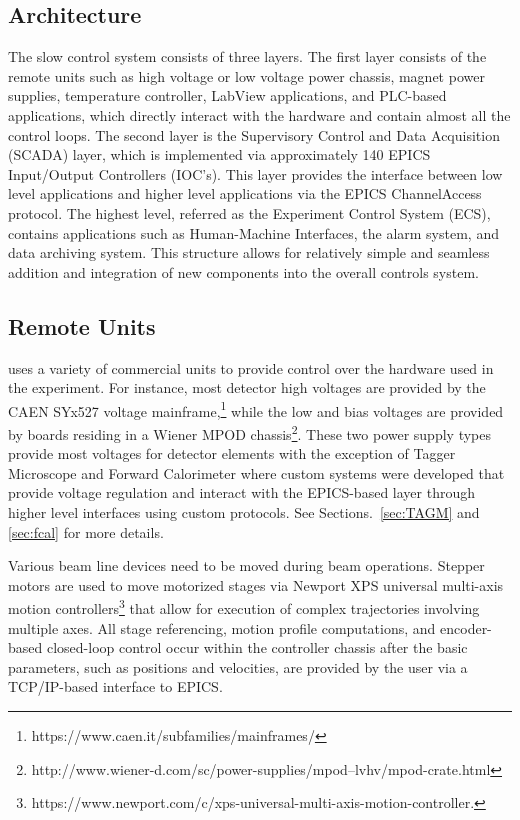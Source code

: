\subsection{Architecture \label{sec:controlsarchitechture}}
The \gx{} slow control system consists of three layers. The first layer consists of the remote units such as high voltage or low voltage power chassis, magnet power supplies, temperature controller, LabView applications, and PLC-based applications, which directly interact with the hardware and contain almost all the control loops. The second layer is the Supervisory Control and Data Acquisition (SCADA) layer, which is implemented via approximately 140 EPICS Input/Output Controllers (IOC's). This layer provides the interface between low level applications and higher level applications via the EPICS ChannelAccess protocol. The highest level, referred as the Experiment Control System (ECS), contains applications such as Human-Machine Interfaces, the alarm system, and data archiving system. This structure allows for relatively simple and seamless addition and integration of new components into the overall controls system.    

\subsection{Remote Units \label{sec:controlsinterface}}
\gx{} uses a variety of commercial units to provide control over the hardware used in the experiment. For instance, most detector high voltages are provided by the CAEN SYx527 voltage mainframe,\footnote{https://www.caen.it/subfamilies/mainframes/} while the low and bias voltages are provided by boards residing in a Wiener MPOD chassis\footnote{http://www.wiener-d.com/sc/power-supplies/mpod--lvhv/mpod-crate.html}. These two power supply types provide most voltages for detector elements with the exception of Tagger Microscope and Forward Calorimeter where custom systems were developed that provide voltage regulation and interact with the EPICS-based layer through higher level interfaces using custom protocols. See Sections.~\ref{sec:TAGM} and \ref{sec:fcal} for more details.  

Various beam line devices need to be moved during beam operations. Stepper motors are used to move motorized stages via Newport XPS universal multi-axis motion controllers\footnote{https://www.newport.com/c/xps-universal-multi-axis-motion-controller.} that allow for execution of complex trajectories involving multiple axes. All stage referencing, motion profile computations, and encoder-based closed-loop control occur within the controller chassis after the basic parameters, such as positions and velocities, are provided by the user via a TCP/IP-based interface to EPICS.   

